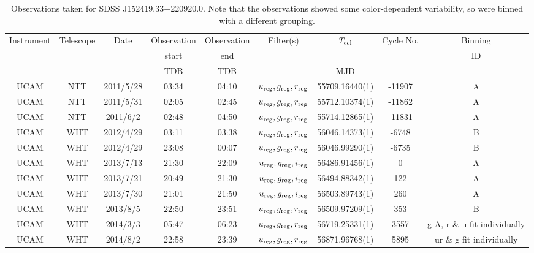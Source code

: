 \begin{table}
	\begin{center}
		\caption{Observations taken for SDSS J152419.33+220920.0. Note that the observations showed some color-dependent variability, so were binned with a different grouping.}
		\label{table:observing:observation logs SDSS J152419.33+220920.0}
		\begin{tabular}{ccccccccc}
			\hline
			Instrument & Telescope & Date & Observation  & Observation  & Filter(s) & $T_{\rm ecl}$ & Cycle No. & Binning \\
			 &  &  &  start &  end &  &  &  & ID \\
			 &  &  & TDB & TDB &  & MJD &  &  \\
			\hline
			\hline
			UCAM & NTT & 2011/5/28  & 03:34 & 04:10 & $u_{\rm reg},g_{\rm reg},r_{\rm reg}$ & 55709.16440(1) & -11907 & A \\
			UCAM & NTT & 2011/5/31  & 02:05 & 02:45 & $u_{\rm reg},g_{\rm reg},r_{\rm reg}$ & 55712.10374(1) & -11862 & A \\
			UCAM & NTT & 2011/6/2   & 02:48 & 04:50 & $u_{\rm reg},g_{\rm reg},r_{\rm reg}$ & 55714.12865(1) & -11831 & A \\
			UCAM & WHT & 2012/4/29  & 03:11 & 03:38 & $u_{\rm reg},g_{\rm reg},r_{\rm reg}$ & 56046.14373(1) & -6748  & B \\
			UCAM & WHT & 2012/4/29  & 23:08 & 00:07 & $u_{\rm reg},g_{\rm reg},r_{\rm reg}$ & 56046.99290(1) & -6735  & B \\
			UCAM & WHT & 2013/7/13  & 21:30 & 22:09 & $u_{\rm reg},g_{\rm reg},i_{\rm reg}$ & 56486.91456(1) & 0      & A \\
			UCAM & WHT & 2013/7/21  & 20:49 & 21:30 & $u_{\rm reg},g_{\rm reg},i_{\rm reg}$ & 56494.88342(1) & 122    & A \\
			UCAM & WHT & 2013/7/30  & 21:01 & 21:50 & $u_{\rm reg},g_{\rm reg},i_{\rm reg}$ & 56503.89743(1) & 260    & A \\
			UCAM & WHT & 2013/8/5   & 22:50 & 23:51 & $u_{\rm reg},g_{\rm reg},r_{\rm reg}$ & 56509.97209(1) & 353    & B \\
			UCAM & WHT & 2014/3/3   & 05:47 & 06:23 & $u_{\rm reg},g_{\rm reg},r_{\rm reg}$ & 56719.25331(1) & 3557   & g A, r \& u fit individually \\
			UCAM & WHT & 2014/8/2   & 22:58 & 23:39 & $u_{\rm reg},g_{\rm reg},r_{\rm reg}$ & 56871.96768(1) & 5895   & ur \& g fit individually \\
		   \hline
		\end{tabular}
	\end{center}
\end{table}